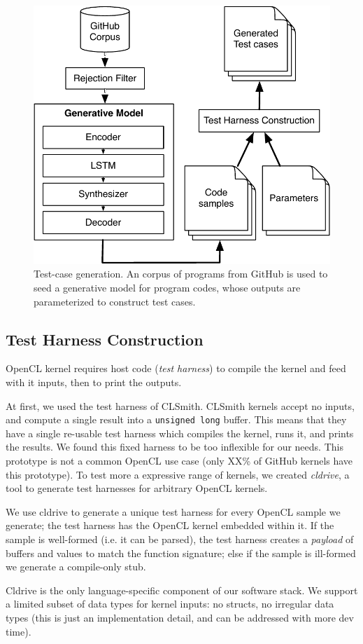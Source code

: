 \begin{figure}
  \centering
  \includegraphics[width=.85\columnwidth]{img/clgen} %
  \caption{%
    Test-case generation. An corpus of programs from GitHub is used to seed a generative model for program codes, whose outputs are parameterized to construct test cases.%
  }%
  \label{fig:deeptune}
\end{figure}


\subsection{Test Harness Construction}

OpenCL kernel requires host code (\emph{test harness}) to compile the kernel and feed with it inputs, then to print the outputs.

At first, we used the test harness of CLSmith. CLSmith kernels accept no inputs, and compute a single result into a \texttt{unsigned long} buffer. This means that they have a single re-usable test harness which compiles the kernel, runs it, and prints the results. We found this fixed harness to be too inflexible for our needs. This prototype is not a common OpenCL use case (only XX\% of GitHub kernels have this prototype). To test more a expressive range of kernels, we created \emph{cldrive}, a tool to generate test harnesses for arbitrary OpenCL kernels.

We use cldrive to generate a unique test harness for every OpenCL sample we generate; the test harness has the OpenCL kernel embedded within it. If the sample is well-formed (i.e. it can be parsed), the test harness creates a \emph{payload} of buffers and values to match the function signature; else if the sample is ill-formed we generate a compile-only stub. 

Cldrive is the only language-specific component of our software stack. We support a limited subset of data types for kernel inputs: no structs, no irregular data types (this is just an implementation detail, and can be addressed with more dev time).

